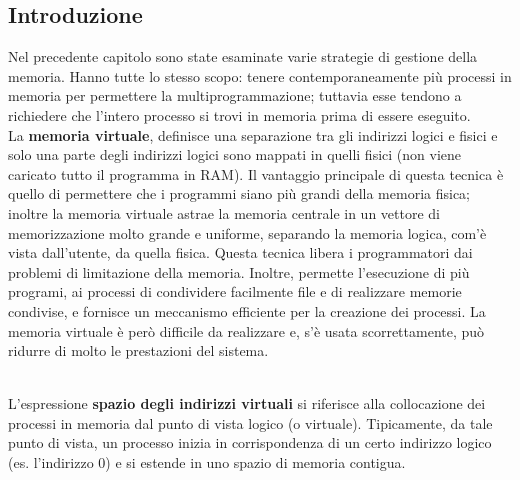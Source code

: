 \documentclass{article}
\begin{document}
		\subsection{Introduzione}
			Nel precedente capitolo sono state esaminate varie strategie di gestione della memoria. Hanno tutte lo stesso scopo: tenere contemporaneamente più processi in memoria per permettere la multiprogrammazione; tuttavia esse tendono a richiedere che l’intero processo si trovi in memoria prima di essere eseguito.
			\\La \textbf{memoria virtuale}, definisce una separazione tra gli indirizzi logici e fisici e solo una parte degli indirizzi logici sono mappati in quelli fisici (non viene caricato tutto il programma in RAM). Il vantaggio principale di questa tecnica è quello di permettere che i programmi siano più grandi della memoria fisica; inoltre la memoria virtuale astrae la memoria centrale in un vettore di memorizzazione molto grande e uniforme, separando la memoria logica, com’è vista dall’utente, da quella fisica. Questa tecnica libera i programmatori dai problemi di limitazione della memoria. Inoltre, permette l'esecuzione di più programi, ai processi di condividere facilmente file e di realizzare memorie condivise, e fornisce un meccanismo efficiente per la creazione dei processi. La memoria virtuale è però difficile da realizzare e, s’è usata scorrettamente, può ridurre di molto le prestazioni del sistema. 
			\begin{figure}[ht!]
			\end{figure}
			\\L’espressione \textbf{spazio degli indirizzi virtuali} si riferisce alla collocazione dei processi in memoria dal punto di vista logico (o virtuale). Tipicamente, da tale punto di vista, un processo inizia in corrispondenza di un certo indirizzo logico (es. l’indirizzo 0) e si estende in uno spazio di memoria contigua.
			\begin{figure}[ht!]
			\end{figure}
\end{document}
